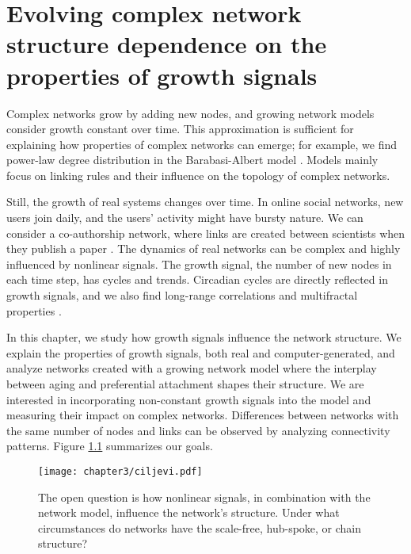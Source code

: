 
\chapter{Evolving complex network structure dependence on the properties of growth signals} 
\label{Ch:signals}

Complex networks grow by adding new nodes, and growing network models consider growth constant over time. This approximation is sufficient for explaining how properties of complex networks can emerge; for example, we find power-law degree distribution in the Barabasi-Albert model \cite{barabasi1999}. 
Models mainly focus on linking rules and their influence on the topology of complex networks. 

Still, the growth of real systems changes over time. In online social networks, new users join daily, and the users' activity might have bursty nature. We can consider a co-authorship network, where links are created between scientists when they publish a paper \cite{barabasi2002evolution, newman2001structure}. The dynamics of real networks can be complex and highly influenced by nonlinear signals. The growth signal, the number of new nodes in each time step, has cycles and trends. Circadian cycles are directly reflected in growth signals, and we also find long-range correlations and multifractal properties \cite{fan2012fractal}. 

In this chapter, we study how growth signals influence the network structure. We explain the properties of growth signals, both real and computer-generated, and
analyze networks created with a growing network model where the interplay between aging and preferential attachment shapes their structure. We are interested in incorporating non-constant growth signals into the model and measuring their impact on complex networks. Differences between networks with the same number of nodes and links can be observed by analyzing connectivity patterns. Figure \ref{fig:ciljevi} summarizes our goals. 

\begin{figure}[h]
	\centering
	\texttt{[image: chapter3/ciljevi.pdf]}
	\caption[Nonlinear growth of the network.]{The open question is how nonlinear signals, in combination with the network model, influence the network's structure. Under what circumstances do networks have the scale-free, hub-spoke, or chain structure? }
	\label{fig:ciljevi}
\end{figure}

